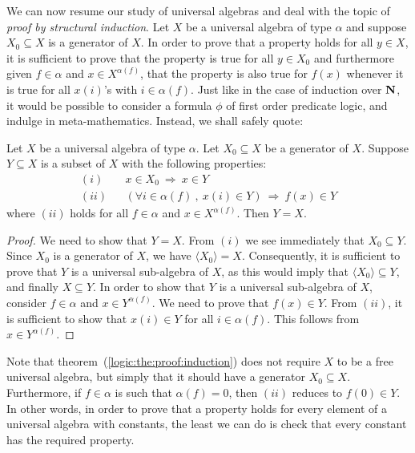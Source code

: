 We can now resume our study of universal algebras and deal with the
topic of {\em proof by structural induction}. Let $X$ be a universal
algebra of type $\alpha$ and suppose $X_{0}\subseteq X$ is a
generator of $X$. In order to prove that a property holds for all
$y\in X$, it is sufficient to prove that the property is true for
all $y\in X_{0}$ and furthermore given $f\in\alpha$ and $x\in
X^{\alpha(f)}$, that the property is also true for $f(x)$ whenever
it is true for all $x(i)$'s with $i\in\alpha(f)$. Just like in the
case of induction over $\mbox{$\bf N$}$, it would be possible to consider a
formula $\phi$ of first order predicate logic, and indulge in
meta-mathematics. Instead, we shall safely quote:
\begin{theorem}\label{logic:the:proof:induction}
Let $X$ be a universal algebra of type $\alpha$. Let $X_{0}\subseteq
X$ be a generator of $X$. Suppose $Y\subseteq X$ is a subset of $X$
with the following properties:
    \begin{eqnarray*}
    (i)&& x\in X_{0}\ \Rightarrow\ x\in Y\\
    (ii)&&(\forall i\in\alpha(f)\ ,\ x(i)\in Y)\ \Rightarrow\ f(x)\in Y
    \end{eqnarray*}
where $(ii)$ holds for all $f\in\alpha$ and $x\in X^{\alpha(f)}$.
Then $Y=X$.
\end{theorem}
\begin{proof}
We need to show that $Y=X$. From $(i)$ we see immediately that
$X_{0}\subseteq Y$. Since $X_{0}$ is a generator of $X$, we have
$\langle X_{0}\rangle =X$. Consequently, it is sufficient to prove
that $Y$ is a universal sub-algebra of $X$, as this would imply that
$\langle X_{0}\rangle\subseteq Y$, and finally $X\subseteq Y$. In
order to show that $Y$ is a universal sub-algebra of $X$, consider
$f\in\alpha$ and $x\in Y^{\alpha(f)}$. We need to prove that
$f(x)\in Y$. From $(ii)$, it is sufficient to show that $x(i)\in Y$
for all $i\in\alpha(f)$. This follows from $x\in Y^{\alpha(f)}$.
\end{proof}

Note that theorem~(\ref{logic:the:proof:induction}) does not require
$X$ to be a free universal algebra, but simply that it should have a
generator $X_{0}\subseteq X$. Furthermore, if $f\in\alpha$ is such
that $\alpha(f)=0$, then $(ii)$ reduces to $f(0)\in Y$. In other
words, in order to prove that a property holds for every element of
a universal algebra with constants, the least we can do is check
that every constant has the required property.
